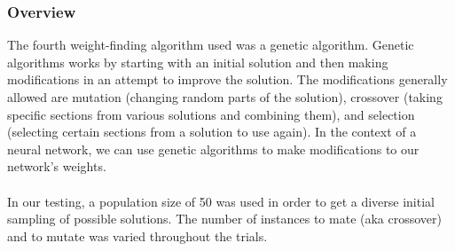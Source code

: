 \documentclass[h]{article}
\begin{document}
\subsubsection*{Overview}
The fourth weight-finding algorithm used was a genetic algorithm.  Genetic 
algorithms works by starting with an initial solution and then making 
modifications in an attempt to improve the solution.  The modifications 
generally allowed are mutation (changing random parts of the solution), crossover (taking specific sections
 from various solutions and combining them), and selection (selecting certain sections from a solution to use again). 
  In the context of a neural network, we can use genetic algorithms to make 
  modifications to our network's weights.
 \\ \\ 
 In our testing, a population size of 50 was used in order to get a diverse 
 initial sampling of possible solutions.  The number of instances to mate (aka crossover) and to 
 mutate was varied throughout the trials.
 
\end{document}
